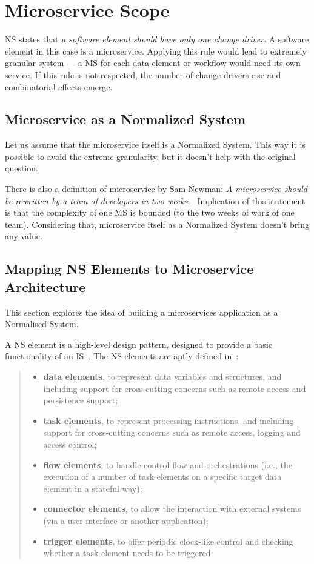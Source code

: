 \documentclass[thesis=M,english,hidelinks]{FITthesis}[2012/10/20]
\begin{document}
\section{Microservice Scope}
\acrshort{NS} states that \textit{a software element should have only one change driver}. A software element in this case is a microservice. Applying this rule would lead to extremely granular system --- a \acrshort{MS} for each data element or workflow would need its own service. If this rule is not respected, the number of change drivers rise and combinatorial effects emerge. 

\subsection{Microservice as a Normalized System}
Let us assume that the microservice itself is a Normalized System. This way it is possible to avoid the extreme granularity, but it doesn't help with the original question.

There is also a definition of microservice by Sam Newman: \textit{A microservice should be rewritten by a team of developers in two weeks.}~\cite{ms-building-ms} Implication of this statement is that the complexity of one \acrshort{MS} is bounded (to the two weeks of work of one team). Considering that, microservice itself as a Normalized System doesn't bring any value.

\subsection{Mapping NS Elements to Microservice Architecture}
\label{sec:mapping_ns_elems}
This section explores the idea of building a microservices application as a Normalised System.

A \acrshort{NS} element is a high-level design pattern, designed to provide a basic functionality of an \acrlong{IS}~\cite{ns-toward-general-theory}. The \acrshort{NS} elements are aptly defined in~\cite{ns-in-practice}:
\begin{quote}
    \begin{itemize}
        \item \textbf{data elements}, to represent data variables and structures, and including support for cross-cutting concerns such as remote access and persistence support;
        \item \textbf{task elements}, to represent processing instructions, and including support for cross-cutting concerns such as remote access, logging and access control;
        \item \textbf{flow elements}, to handle control flow and orchestrations (i.e., the execution of a number of task elements on a specific target data element in a stateful way);
        \item \textbf{connector elements}, to allow the interaction with external systems (via a user interface or another application);
        \item \textbf{trigger elements}, to offer periodic clock-like control and checking whether a task element needs to be triggered.
    \end{itemize}
\end{quote}
\end{document}
